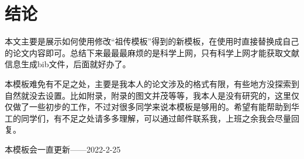 \chapter{结\texorpdfstring{\quad}{}论}
本文主要是展示如何使用修改“祖传模板”得到的新模板，在使用时直接替换成自己的论文内容即可。总结下来最最最麻烦的是科学上网，只有科学上网才能获取文献信息生成bib文件，后面就好办了。

本模板难免有不足之处，主要是我本人的论文涉及的格式有限，有些地方没探索到自然就没去设置。比如附录，附录的图文并茂等等，我本人是没有研究的，这里仅仅做了一些初步的工作，不过对很多同学来说本模板是够用的。希望有能帮助到华工的同学们，有不足之处请多多理解，可以通过邮件联系我，上班之余我会尽量回复。

本模板会一直更新——2022-2-25